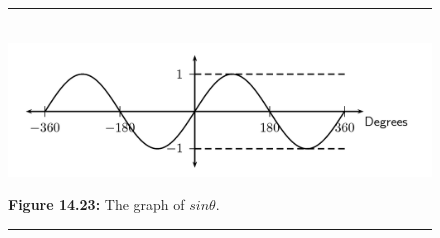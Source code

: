     \setcounter{subfigure}{0}
	\begin{figure}[H] %
    \begin{center}
    \rule[.1in]{\figurerulewidth}{.005in} \\
        \label{m39414*uid31!!!underscore!!!media}\label{m39414*uid31!!!underscore!!!printimage}\includegraphics{col11306.imgs/m39414_MG10C15_017.png} %
      \vspace{2pt}
    \vspace{\rubberspace}\par \begin{cnxcaption}
	  \small \textbf{Figure 14.23: }The graph of $sin\theta $.
	\end{cnxcaption}
    \vspace{.1in}
    \rule[.1in]{\figurerulewidth}{.005in} \\
    \end{center}
 \end{figure}       
      \label{m39414*uid32}
